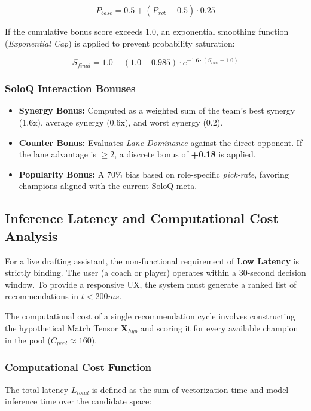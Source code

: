 \documentclass[12pt, a4paper]{article}
\begin{document}
    \begin{equation}
        P_{base} = 0.5 + (P_{xgb} - 0.5) \cdot 0.25
    \end{equation}

    If the cumulative bonus score exceeds 1.0, an exponential smoothing function (\textit{Exponential Cap}) is applied to prevent probability saturation:

    \begin{equation}
        S_{final} = 1.0 - (1.0 - 0.985) \cdot e^{-1.6 \cdot (S_{raw} - 1.0)}
    \end{equation}

    \subsubsection{SoloQ Interaction Bonuses}
    \begin{itemize}
        \item \textbf{Synergy Bonus:} Computed as a weighted sum of the team’s best synergy (1.6x), average synergy (0.6x), and worst synergy (0.2).
        \item \textbf{Counter Bonus:} Evaluates \textit{Lane Dominance} against the direct opponent. If the lane advantage is $\geq 2$, a discrete bonus of \textbf{+0.18} is applied.
        \item \textbf{Popularity Bonus:} A 70\% bias based on role-specific \textit{pick-rate}, favoring champions aligned with the current SoloQ meta.
    \end{itemize}


    \subsection{Inference Latency and Computational Cost Analysis}

    For a live drafting assistant, the non-functional requirement of \textbf{Low Latency} is strictly binding. The user (a coach or player) operates within a 30-second decision window. To provide a responsive UX, the system must generate a ranked list of recommendations in $t < 200ms$.

    The computational cost of a single recommendation cycle involves constructing the hypothetical Match Tensor $\mathbf{X}_{hyp}$ and scoring it for every available champion in the pool ($C_{pool} \approx 160$).

    \subsubsection{Computational Cost Function}
    The total latency $L_{total}$ is defined as the sum of vectorization time and model inference time over the candidate space:
\end{document}
